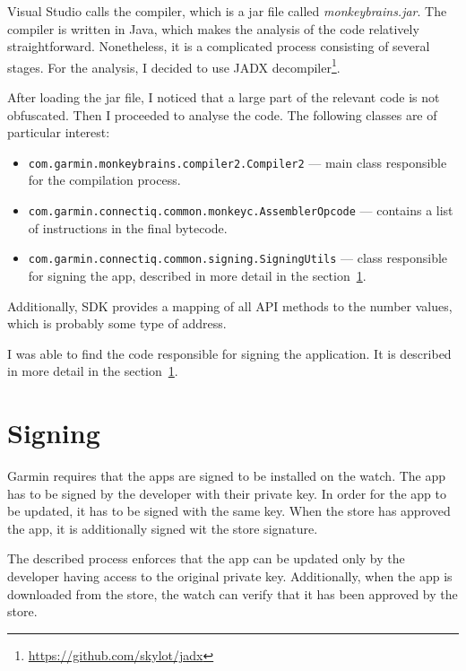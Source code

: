 Visual Studio calls the compiler, which is a jar file called \textit{monkeybrains.jar}.
The compiler is written in Java, which makes the analysis of the code relatively straightforward.
Nonetheless, it is a complicated process consisting of several stages.
For the analysis, I decided to use JADX decompiler\footnote{\url{https://github.com/skylot/jadx}}.

After loading the jar file, I noticed that a large part of the relevant code is not obfuscated.
Then I proceeded to analyse the code.
The following classes are of particular interest:
\begin{itemize}
    \item \texttt{com.garmin.monkeybrains.compiler2.Compiler2} — main class responsible for the compilation process.
    \item \texttt{com.garmin.connectiq.common.monkeyc.AssemblerOpcode} — contains a list of instructions in the final bytecode.
    \item \texttt{com.garmin.connectiq.common.signing.SigningUtils} — class responsible for signing the app, described in more detail in the section~\ref{subsec:signing}.
\end{itemize}
Additionally, SDK provides a mapping of all API methods to the number values, which is probably some type of address.

I was able to find the code responsible for signing the application.
It is described in more detail in the section~\ref{subsec:signing}.

\section{Signing} \label{subsec:signing}
Garmin requires that the apps are signed to be installed on the watch\cite{garmin-signing}.
The app has to be signed by the developer with their private key.
In order for the app to be updated, it has to be signed with the same key.
When the store has approved the app, it is additionally signed wit the store signature.

The described process enforces that the app can be updated only by the developer having access to the original private key.
Additionally, when the app is downloaded from the store, the watch can verify that it has been approved by the store.


